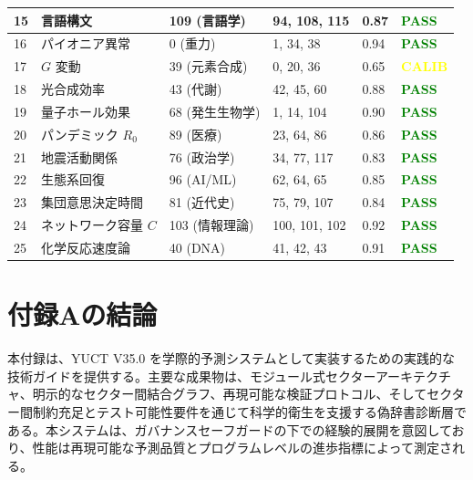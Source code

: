 \documentclass[13pt,a4paper]{ltjsarticle}
\begin{document}
\begin{longtable}{|p{0.8cm}|p{2.5cm}|p{1.8cm}|p{1.5cm}|p{1.5cm}|p{1.8cm}|}
		\hline
		15 & 言語構文 & 109 (言語学) & 94, 108, 115 & 0.87 & \textcolor{green}{\textbf{PASS}} \\
		\hline
		16 & パイオニア異常 & 0 (重力) & 1, 34, 38 & 0.94 & \textcolor{green}{\textbf{PASS}} \\
		\hline
		17 & $G$ 変動 & 39 (元素合成) & 0, 20, 36 & 0.65 & \textcolor{yellow}{\textbf{CALIB}} \\
		\hline
		18 & 光合成効率 & 43 (代謝) & 42, 45, 60 & 0.88 & \textcolor{green}{\textbf{PASS}} \\
		\hline
		19 & 量子ホール効果 & 68 (発生生物学) & 1, 14, 104 & 0.90 & \textcolor{green}{\textbf{PASS}} \\
		\hline
		20 & パンデミック $R_0$ & 89 (医療) & 23, 64, 86 & 0.86 & \textcolor{green}{\textbf{PASS}} \\
		\hline
		21 & 地震活動関係 & 76 (政治学) & 34, 77, 117 & 0.83 & \textcolor{green}{\textbf{PASS}} \\
		\hline
		22 & 生態系回復 & 96 (AI/ML) & 62, 64, 65 & 0.85 & \textcolor{green}{\textbf{PASS}} \\
		\hline
		23 & 集団意思決定時間 & 81 (近代史) & 75, 79, 107 & 0.84 & \textcolor{green}{\textbf{PASS}} \\
		\hline
		24 & ネットワーク容量 $C$ & 103 (情報理論) & 100, 101, 102 & 0.92 & \textcolor{green}{\textbf{PASS}} \\
		\hline
		25 & 化学反応速度論 & 40 (DNA) & 41, 42, 43 & 0.91 & \textcolor{green}{\textbf{PASS}} \\
		\hline
	\end{longtable}
	
	
	\section*{付録Aの結論}
	
	本付録は、YUCT V35.0 を学際的予測システムとして実装するための実践的な技術ガイドを提供する。主要な成果物は、モジュール式セクターアーキテクチャ、明示的なセクター間結合グラフ、再現可能な検証プロトコル、そしてセクター間制約充足とテスト可能性要件を通じて科学的衛生を支援する偽辞書診断層である。本システムは、ガバナンスセーフガードの下での経験的展開を意図しており、性能は再現可能な予測品質とプログラムレベルの進歩指標によって測定される。
	
\end{document}
